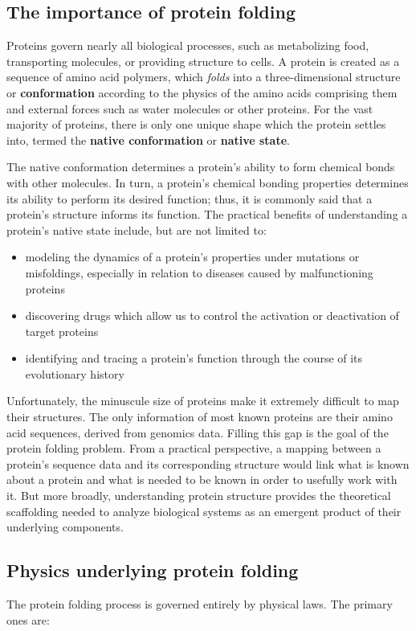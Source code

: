 \documentclass{article}
\begin{document}
\subsection{The importance of protein folding}
Proteins govern nearly all biological processes, such as metabolizing food, transporting molecules, or providing structure to cells. A protein is created as a sequence of amino acid polymers, which \textit{folds} into a three-dimensional structure or \textbf{conformation} according to the physics of the amino acids comprising them and external forces such as water molecules or other proteins. For the vast majority of proteins, there is only one unique shape which the protein settles into, termed the \textbf{native conformation} or \textbf{native state}.

The native conformation determines a protein's ability to form chemical bonds with other molecules. In turn, a protein's chemical bonding properties determines its ability to perform its desired function; thus, it is commonly said that a protein's structure informs its function. The practical benefits of understanding a protein's native state include, but are not limited to:

\begin{itemize}
    \item modeling the dynamics of a protein's properties under mutations or misfoldings, especially in relation to diseases caused by malfunctioning proteins
    \item discovering drugs which allow us to control the activation or deactivation of target proteins
    \item identifying and tracing a protein's function through the course of its evolutionary history
\end{itemize}

Unfortunately, the minuscule size of proteins make it extremely difficult to map their structures. The only information of most known proteins are their amino acid sequences, derived from genomics data. Filling this gap is the goal of the protein folding problem. From a practical perspective, a mapping between a protein's sequence data and its corresponding structure would link what is known about a protein and what is needed to be known in order to usefully work with it. But more broadly, understanding protein structure provides the theoretical scaffolding needed to analyze biological systems as an emergent product of their underlying components.

\subsection{Physics underlying protein folding}
The protein folding process is governed entirely by physical laws. The primary ones are:
\end{document}
